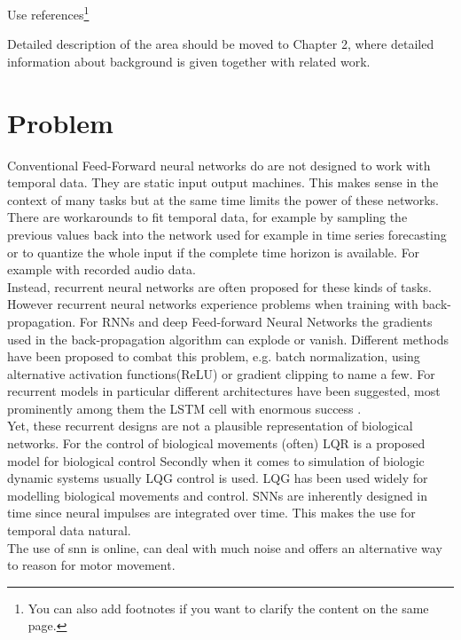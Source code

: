 Use references\footnote{You can also add footnotes if you want to clarify the content on the same page.}

Detailed description of the area should be moved to Chapter 2, where detailed information about background is given together with related work.



%

\section{Problem}





Conventional Feed-Forward neural networks do are not designed to work with temporal data. They are static input output machines. This makes sense in the context of many tasks but at the same time limits the power of these networks. There are workarounds to fit temporal data, for example by sampling the previous values back into the network used for example in time series forecasting \cite{tang_feedforward_1993}\cite{yang_cascade_2022}\cite{uncini_audio_2003} or to quantize the whole input if the complete time horizon is available. For example with recorded audio data.\\
Instead, recurrent neural networks are often proposed for these kinds of tasks. However recurrent neural networks experience problems when training with back-propagation\cite{bengio_learning_1994}. For \acp{RNN} and deep Feed-forward Neural Networks the gradients used in the back-propagation algorithm can explode or vanish. Different methods have been proposed to combat this problem, e.g. batch normalization\cite{ioffe_batch_2015}, using alternative activation functions(ReLU)\cite{nair_rectified_2010} or gradient clipping\cite{pascanu_difficulty_2013} to name a few. For recurrent models in particular different architectures have been suggested, most prominently among them the LSTM cell \cite{hochreiter_long_1997} with enormous success \cite{mayer_system_2006, sak_long_2014, li_constructing_2015}.\\
Yet, these recurrent designs are not a plausible representation of biological networks.
For the control of biological movements (often) \ac{LQR} is a proposed model for biological control \cite{li_iterative_2004}
Secondly when it comes to simulation of biologic dynamic systems usually \ac{LQG} control is used. LQG has been used widely for modelling biological movements and control.
\acp{SNN} are inherently designed in time since neural impulses are integrated over time. This makes the use for temporal data natural.\\
The use of snn is online, can deal with much noise and offers an alternative way to reason for motor movement.

